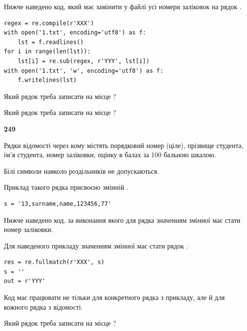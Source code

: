 Нижче наведено код, який має замінити у файлі усі номери заліковок на рядок \code{***}.



\begin{verbatim}
regex = re.compile(r'XXX')
with open('1.txt', encoding='utf8') as f:
    lst = f.readlines()
for i in range(len(lst)):
    lst[i] = re.sub(regex, r'YYY', lst[i])
with open('1.txt', 'w', encoding='utf8') as f:
    f.writelines(lst)
\end{verbatim}







Який рядок треба записати на місце  ?\par
\vspace{5mm}


Який рядок треба записати на місце  ?\par


\newpage

{\begin {center}\textbf{ 249}\end {center}}\par
Рядки відомості через кому містять порядковий номер (ціле), пріз\-ви\-ще студен\-та, ім'я студента, номер заліковки, оцінку в балах за 100 бальною шкалою.

Білі символи навколо роздільників не допускаються.

Приклад такого рядка присвоєно змінній .



\begin{verbatim}
s = '13,surname,name,123456,77'
\end{verbatim}


Нижче наведено код, за виконання якого для рядка  значенням змінної  має стати номер заліковки.

Для наведеного прикладу значенням змінної  має стати рядок  .



\begin{verbatim}
res = re.fullmatch(r'XXX', s)
s = ''
out = r'YYY'
\end{verbatim}


Код має працювати не тільки для конкретного рядка з прикладу, але й для кожного рядка з відомості.




Який рядок треба записати на місце  ?\par
\vspace{5mm}


